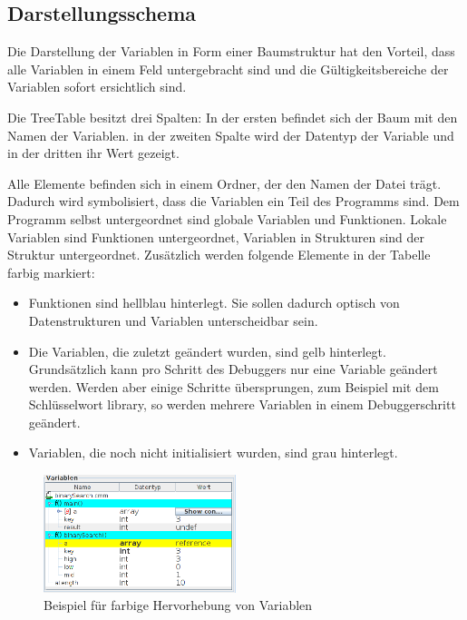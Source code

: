 \subsection{Darstellungsschema}

Die Darstellung der Variablen in Form einer Baumstruktur hat den Vorteil, dass alle Variablen in einem Feld untergebracht sind und die Gültigkeitsbereiche der Variablen sofort ersichtlich sind.

Die TreeTable besitzt drei Spalten: In der ersten befindet sich der Baum mit den Namen der Variablen. in der zweiten Spalte wird der Datentyp der Variable und in der dritten ihr Wert gezeigt.

Alle Elemente befinden sich in einem Ordner, der den Namen der Datei trägt. Dadurch wird symbolisiert, dass die Variablen ein Teil des Programms sind. Dem Programm selbst untergeordnet sind globale Variablen und Funktionen. Lokale Variablen sind Funktionen untergeordnet, Variablen in Strukturen sind der Struktur untergeordnet.
Zusätzlich werden folgende Elemente in der Tabelle farbig markiert:
\begin{itemize}
\item Funktionen sind hellblau hinterlegt. Sie sollen dadurch optisch von Datenstrukturen und Variablen unterscheidbar sein.
\item Die Variablen, die zuletzt geändert wurden, sind gelb hinterlegt. Grundsätzlich kann pro Schritt des Debuggers nur eine Variable geändert werden. Werden aber einige Schritte übersprungen, zum Beispiel mit dem Schlüsselwort \glqq{}library\grqq{}, so werden mehrere Variablen in einem Debuggerschritt geändert.
\item Variablen, die noch nicht initialisiert wurden, sind grau hinterlegt.
\end{itemize}

\begin{figure}[htp]
\centering
\includegraphics[width=0.5\textwidth]{media/images/gui/debugger/gui-treetable.png}
\caption{Beispiel für farbige Hervorhebung von Variablen}
\label{fig:deb-tt-example}
\end{figure}

